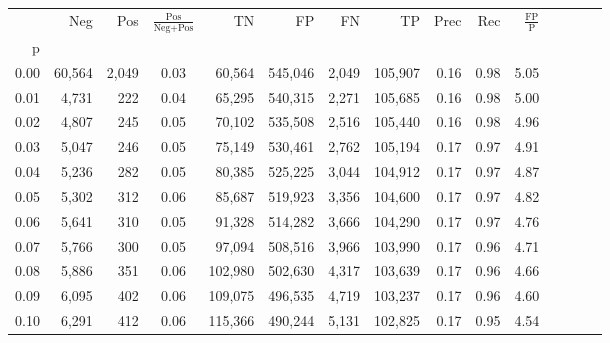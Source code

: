 \begin{tabular}{rrrcrrrrrrrrrrr}
\toprule
{} &     Neg &     Pos & $\frac{\text{Pos}}{\text{Neg}+\text{Pos}}$ &       TN &       FP &       FN &       TP &  Prec &   Rec & $\frac{\text{FP}}{\text{P}}$ \\
p    &         &         &                                            &          &          &          &          &       &       &                              \\
\midrule
0.00 &  60,564 &   2,049 &                                       0.03 &   60,564 &  545,046 &    2,049 &  105,907 &  0.16 &  0.98 &                         5.05 \\
0.01 &   4,731 &     222 &                                       0.04 &   65,295 &  540,315 &    2,271 &  105,685 &  0.16 &  0.98 &                         5.00 \\
0.02 &   4,807 &     245 &                                       0.05 &   70,102 &  535,508 &    2,516 &  105,440 &  0.16 &  0.98 &                         4.96 \\
0.03 &   5,047 &     246 &                                       0.05 &   75,149 &  530,461 &    2,762 &  105,194 &  0.17 &  0.97 &                         4.91 \\
0.04 &   5,236 &     282 &                                       0.05 &   80,385 &  525,225 &    3,044 &  104,912 &  0.17 &  0.97 &                         4.87 \\
0.05 &   5,302 &     312 &                                       0.06 &   85,687 &  519,923 &    3,356 &  104,600 &  0.17 &  0.97 &                         4.82 \\
0.06 &   5,641 &     310 &                                       0.05 &   91,328 &  514,282 &    3,666 &  104,290 &  0.17 &  0.97 &                         4.76 \\
0.07 &   5,766 &     300 &                                       0.05 &   97,094 &  508,516 &    3,966 &  103,990 &  0.17 &  0.96 &                         4.71 \\
0.08 &   5,886 &     351 &                                       0.06 &  102,980 &  502,630 &    4,317 &  103,639 &  0.17 &  0.96 &                         4.66 \\
0.09 &   6,095 &     402 &                                       0.06 &  109,075 &  496,535 &    4,719 &  103,237 &  0.17 &  0.96 &                         4.60 \\
0.10 &   6,291 &     412 &                                       0.06 &  115,366 &  490,244 &    5,131 &  102,825 &  0.17 &  0.95 &                         4.54 \\

\end{tabular}
